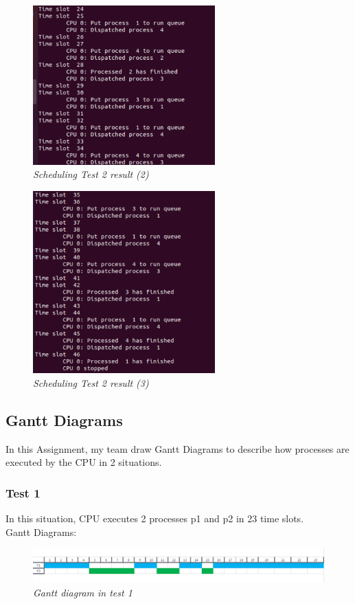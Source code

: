 \documentclass[13pt,a4paper]{article}
\begin{document}
			\begin{figure}[h!]
				\begin{center}
					\includegraphics[width=7cm]{test_sched_2_2.png}
					\caption{\textit{Scheduling Test 2 result (2)}}
				\end{center}
			\end{figure}
			\newpage
			\begin{figure}[h!]
				\begin{center}
					\includegraphics[width=7cm]{test_sched_2_3.png}
					\caption{\textit{Scheduling Test 2 result (3)}}
				\end{center}
			\end{figure}
		\subsection{Gantt Diagrams}
			In this Assignment, my team draw Gantt Diagrams to describe how processes are executed by the CPU in 2 situations.
			\subsubsection{Test 1}
				In this situation, CPU executes 2 processes p1 and p2 in 23 time slots.\\
				Gantt Diagrams:
				\begin{figure}[h!]
					\begin{center}
						\includegraphics[width=15cm]{gantt_0.png}
						\caption{\textit{Gantt diagram in test 1}}
					\end{center}
				\end{figure}
\end{document}

